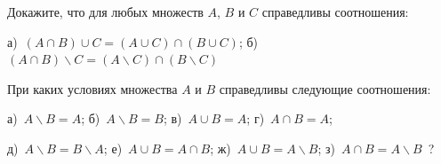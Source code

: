 
\begin{thm}
Докажите, что для любых множеств $A$, $B$ и $C$ справедливы соотношения:
\par
а)~$(A \cap B) \cup C = (A \cup C) \cap (B \cup C)$;
б)~$(A \cap B) \backslash C = (A \backslash C) \cap (B \backslash C)$
\end{thm}

\begin{thm}
При каких условиях множества $A$ и $B$ справедливы следующие соотношения:
\par
а)~$A \backslash B = A$; \hfill
б)~$A \backslash B = B$; \hfill
в)~$A \cup B = A$; \hfill
г)~$A \cap B = A$; 
\par
д)~$A \backslash B = B \backslash A$; \hfill
е)~$A \cup B = A \cap B$; \hfill
ж)~$A \cup B = A \backslash B$; \hfill
з)~$A \cap B = A \backslash B$~?
\end{thm}

